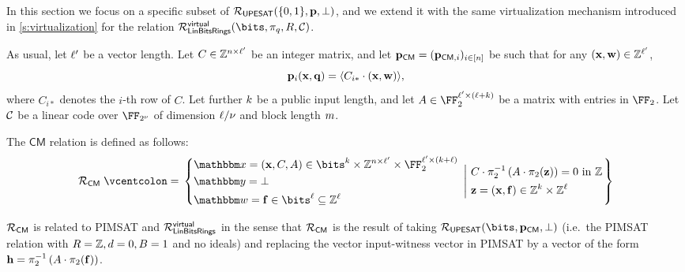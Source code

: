 \documentclass[11pt,letterpaper,usenames,dvipsnames]{article}
\begin{document}


In this section we focus on a specific subset of $\mathcal{R}_{\mathsf{UPESAT}}(\{0,1\},\mathbf{p},\bot)$, and we extend it with the same virtualization mechanism introduced in \cref{s:virtualization} for the relation $\LinBitsDual^{\mathsf{virtual}}(\bits, \pi_q, R, \cC)$.

As usual, let $\ell'$ be a vector length. Let $C\in \mathbb{Z}^{n\times  \ell'}$ be an integer matrix, and let $\mathbf{p}_{\mathsf{CM}} = (\mathbf{p}_{\mathsf{CM}, i})_{i\in [n]}$ be such that for any $(\mathbf{x},\mathbf{w})\in \mathbb{Z}^{\ell'}$, $$\mathbf{p}_i(\mathbf{x},\mathbf{q}) = \langle C_{i*}\cdot (\mathbf{x},\mathbf{w})\rangle,$$ where $C_{i*}$ denotes the $i$-th row of $C$. %
Let further $k$ be a public input length, and let  $\Mmatrix\in \FF_2^{\codedim'\times (\codedim + \inplen)}$ be a matrix with entries in $\FF_2$.  Let $\mathcal{C}$ be a linear code over $\comfield$ of dimension $\ell/\nu$ and block length $m$.

\newcommand{\RELCM}{\Relation_{\mathsf{CM}}}

\begin{definition}
    
The $\mathsf{CM}$ relation is defined as follows:
%
$$
\RELCM \defeq \left\{ \begin{aligned}
    &\inp= (\xx, C, \Mmatrix)\in \bits^{\inplen} \times \ZZ^{\numrows\times \codedim'} \times \FF_2^{\codedim' \times (\inplen+\codedim)}\\
    &\oracle = \bot\\
    & \wit = \bff \in \bits^{\codedim} \subseteq \ZZ^\codedim
\end{aligned}\  \left| \  \begin{aligned} %
&C \cdot \pi_2^{-1}\left(  \Mmatrix\cdot \pi_2(\zz)\right)=0 \ \text{in } \ZZ \\& \zz = (\xx,\bff)\in \ZZ^{\inplen} \times \ZZ^{\codedim} \end{aligned} \right.\right\}
$$
\end{definition}

\begin{remark}
%
    $\RELCM$ is related to PIMSAT and $\mathcal{R}_{\mathsf{LinBitsRings}}^{\mathsf{virtual}}$ in the sense that $\RELCM$ is the result of taking  $\PIMSAT(\bits, \pp_{\mathsf{CM}}, \bot)$ (i.e.\ the PIMSAT relation with $R=\mathbb{Z}, d=0, B=1$ and no ideals) and replacing the vector input-witness vector in PIMSAT by a vector of the form $\mathbf{h}= \pi_2^{-1}\left(A\cdot \pi_2(\mathbf{f})\right)$.
\end{remark}
\end{document}
